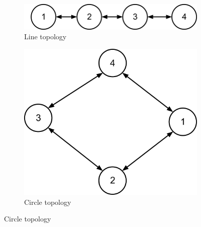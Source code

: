 \documentclass[12pt]{article}
\begin{document}
\begin{figure}[htp]
    \begin{subfigure}[b]{0.5\textwidth}
        \centering
        \includegraphics[scale=0.55]{images/line-topo.png}
        \caption{Line topology}
        \label{fig:line_topology}
    \end{subfigure}
    \begin{subfigure}[b]{0.5\textwidth}
        \includegraphics[scale=0.25]{images/circle-topo.png}
        \caption{Circle topology}
        \label{fig:circle_topology}
    \end{subfigure}


\end{figure}
\end{document}
